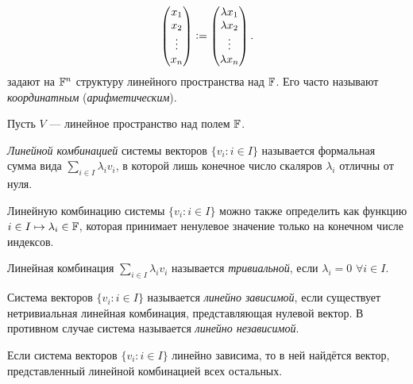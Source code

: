 \begin{example}
\begin{enumerate}
\[                \begin{pmatrix}
                    x_1\\
                    x_2\\
                    \vdots\\
                    x_n
                \end{pmatrix} \vcentcolon=
                \begin{pmatrix}
                    \lambda x_1\\
                    \lambda x_2\\
                    \vdots\\
                    \lambda x_n
                \end{pmatrix}.
            \]
            задают на $\mathbb{F}^n$ структуру линейного пространства над $\mathbb{F}$. Его часто называют \textit{координатным} (\textit{арифметическим}).
    \end{enumerate}
\end{example}

Пусть $V$ --- линейное пространство над полем $\mathbb{F}$.

\begin{definition}
    \textit{Линейной комбинацией} системы векторов $\{v_i: i \in I\}$ называется формальная сумма вида $\sum\limits_{i \in I}\lambda_iv_i$, в которой лишь конечное число скаляров $\lambda_i$ отличны от нуля.
\end{definition}

\begin{remark}
    Линейную комбинацию системы $\{v_i : i \in I\}$ можно также определить как функцию $i \in I \mapsto \lambda_i \in \mathbb{F}$, которая принимает ненулевое значение только на конечном числе индексов.
\end{remark}

\begin{definition}
    Линейная комбинация $\sum\limits_{i \in I}\lambda_iv_i$ называется \textit{тривиальной}, если $\lambda_i = 0$ $\forall i \in I$.
\end{definition}

\begin{definition}
    Система векторов $\{v_i : i \in I\}$ называется \textit{линейно зависимой}, если существует нетривиальная линейная комбинация, представляющая нулевой вектор. В противном случае система называется \textit{линейно независимой}.
\end{definition}

\begin{lemma}
    Если система векторов $\{v_i : i \in I\}$ линейно зависима, то в ней найдётся вектор, представленный линейной комбинацией всех остальных.
\end{lemma}

